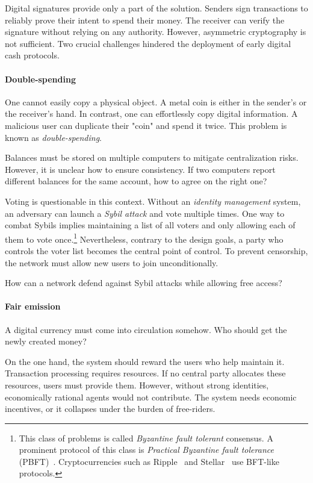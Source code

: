 Digital signatures provide only a part of the solution.
Senders sign transactions to reliably prove their intent to spend their money.
The receiver can verify the signature without relying on any authority.
However, asymmetric cryptography is not sufficient.
Two crucial challenges hindered the deployment of early digital cash protocols.

\paragraph{Double-spending}

One cannot easily copy a physical object.
A metal coin is either in the sender's or the receiver's hand.
In contrast, one can effortlessly copy digital information.
A malicious user can duplicate their "coin" and spend it twice.
This problem is known as \textit{double-spending}.

Balances must be stored on multiple computers to mitigate centralization risks.
However, it is unclear how to ensure consistency.
If two computers report different balances for the same account, how to agree on the right one?

Voting is questionable in this context.
Without an \textit{identity management} system, an adversary can launch a \textit{Sybil attack} and vote multiple times.
One way to combat Sybils implies maintaining a list of all voters and only allowing each of them to vote once.\footnote{This class of problems is called \textit{Byzantine fault tolerant} consensus.
A prominent protocol of this class is \textit{Practical Byzantine fault tolerance} (PBFT)~\cite{Castro2002}.
Cryptocurrencies such as Ripple~\cite{Chase2018} and Stellar~\cite{Mazieres2014} use BFT-like protocols.}
Nevertheless, contrary to the design goals, a party who controls the voter list becomes the central point of control.
To prevent censorship, the network must allow new users to join unconditionally.

How can a network defend against Sybil attacks while allowing free access?


\paragraph{Fair emission}

A digital currency must come into circulation somehow.
Who should get the newly created money?

On the one hand, the system should reward the users who help maintain it.
Transaction processing requires resources.
If no central party allocates these resources, users must provide them.
However, without strong identities, economically rational agents would not contribute.
The system needs economic incentives, or it collapses under the burden of free-riders.

